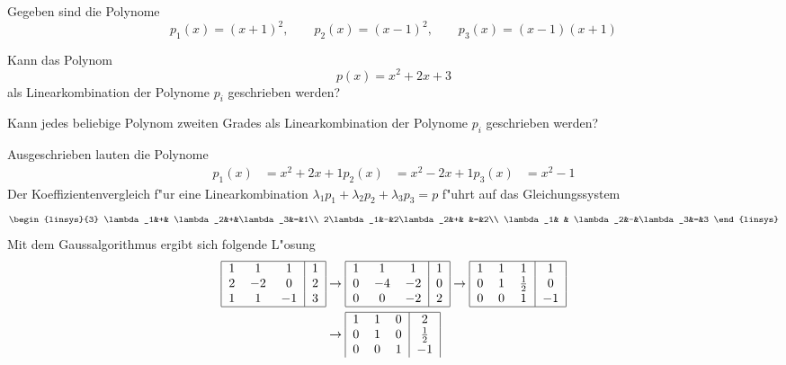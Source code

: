 Gegeben sind die Polynome
\[
p_1(x)=(x+1)^2,\qquad
p_2(x)=(x-1)^2,\qquad
p_3(x)=(x-1)(x+1)
\]
\begin{teilaufgaben}
\item
Kann das Polynom
\[
p(x)=x^2+2x+3
\]
als Linearkombination der Polynome $p_i$
geschrieben werden?
\item Kann jedes beliebige Polynom zweiten Grades als Linearkombination der
Polynome $p_i$ geschrieben werden?
\end{teilaufgaben}

\begin{loesung}
\begin{teilaufgaben}
\item
Ausgeschrieben lauten die Polynome
\begin{align*}
p_1(x)&=x^2+2x+1
p_2(x)&=x^2-2x+1
p_3(x)&=x^2-1
\end{align*}
Der Koeffizientenvergleich f"ur eine Linearkombination
$\lambda_1p_1+\lambda_2p_2+\lambda_3p_3=p$ f"uhrt auf das
Gleichungssystem
\[
\begin{linsys}{3}
\lambda_1&+& \lambda_2&+&\lambda_3&=&1\\
2\lambda_1&-&2\lambda_2&+&         &=&2\\
\lambda_1& & \lambda_2&-&\lambda_3&=&3
\end{linsys}
\]
Mit dem Gaussalgorithmus ergibt sich folgende L"osung
\begin{align*}
\begin{tabular}{|ccc|c|}
\hline
1&1&1&1\\
2&$-2$&0&2\\
1&1&$-1$&3\\
\hline
\end{tabular}
&\rightarrow
\begin{tabular}{|ccc|c|}
\hline
1&1&1&1\\
0&$-4$&$-2$&0\\
0&0&$-2$&2\\
\hline
\end{tabular}
\rightarrow
\begin{tabular}{|ccc|c|}
\hline
1&1&1&1\\
0&1&$\frac12$&0\\
0&0&1&$-1$\\
\hline
\end{tabular}
\\
&\rightarrow
\begin{tabular}{|ccc|c|}
\hline
1&1&0&2\\
0&1&0&$\frac12$\\
0&0&1&$-1$\\

\end{tabular}
\end{align*}
\end{teilaufgaben}
\end{loesung}

